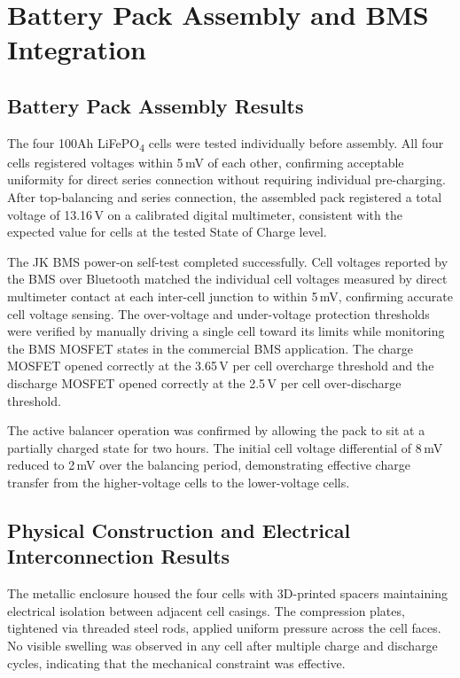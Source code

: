\documentclass[12pt, a4paper]{report}
\begin{document}
{\section{Battery Pack Assembly and BMS Integration}

\subsection{Battery Pack Assembly Results}

The four 100Ah LiFePO\textsubscript{4} cells were tested individually
before assembly. All four cells registered voltages within 5\,mV of each
other, confirming acceptable uniformity for direct series connection without
requiring individual pre-charging. After top-balancing and series
connection, the assembled pack registered a total voltage of 13.16\,V on a
calibrated digital multimeter, consistent with the expected value for cells
at the tested State of Charge level.

The JK BMS power-on self-test completed successfully. Cell voltages
reported by the BMS over Bluetooth matched the individual cell voltages
measured by direct multimeter contact at each inter-cell junction to within
5\,mV, confirming accurate cell voltage sensing. The over-voltage and
under-voltage protection thresholds were verified by manually driving a
single cell toward its limits while monitoring the BMS MOSFET states in
the commercial BMS application. The charge MOSFET opened correctly at the
3.65\,V per cell overcharge threshold and the discharge MOSFET opened
correctly at the 2.5\,V per cell over-discharge threshold.

The active balancer operation was confirmed by allowing the pack to sit
at a partially charged state for two hours. The initial cell voltage
differential of 8\,mV reduced to 2\,mV over the balancing period,
demonstrating effective charge transfer from the higher-voltage cells to
the lower-voltage cells.

\subsection{Physical Construction and Electrical Interconnection Results}

The metallic enclosure housed the four cells with 3D-printed spacers
maintaining electrical isolation between adjacent cell casings. The
compression plates, tightened via threaded steel rods, applied uniform
pressure across the cell faces. No visible swelling was observed in any
cell after multiple charge and discharge cycles, indicating that the
mechanical constraint was effective.

}
\end{document}
